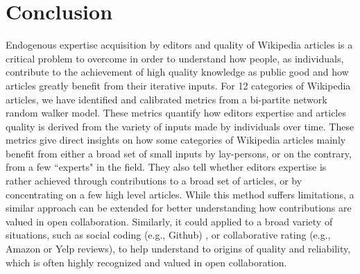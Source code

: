 \section{Conclusion}
Endogenous expertise acquisition by editors and quality of Wikipedia articles is a critical problem to overcome in order to understand how people, as individuals, contribute to the achievement of high quality knowledge as public good and how articles greatly benefit from their iterative inputs. For 12 categories of Wikipedia articles, we have identified and calibrated metrics from a {bi-partite network random walker} model. These metrics quantify how editors expertise and articles quality is derived from the variety of inputs made by individuals over time. These metrics give direct insights on how some categories of Wikipedia articles mainly benefit from either a broad set of small inputs by lay-persons, or on the contrary, from a few ``experts" in the field. They also tell whether editors expertise is rather achieved through contributions to a broad set of articles, or by concentrating on a few high level articles. While this method suffers limitations, a similar approach can be extended for better understanding how contributions are valued in open collaboration. Similarly, it could applied to a broad variety of situations, such as social coding (e.g., Github) , or collaborative rating (e.g., Amazon or Yelp reviews), to help understand to origins of quality and reliability, which is often highly recognized and valued in open collaboration.